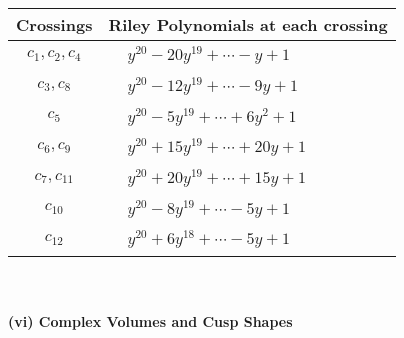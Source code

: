 \documentclass[1p]{elsarticle_modified}
\theoremstyle{definition}
\begin{document}
\begin{tabular}{m{50pt}|m{274pt}}
Crossings & \hspace{64pt}Riley Polynomials at each crossing \\
\hline $$\begin{aligned}c_{1},c_{2},c_{4}\end{aligned}$$&$\begin{aligned}
&y^{20}-20 y^{19}+\cdots- y+1
\end{aligned}$\\
\hline $$\begin{aligned}c_{3},c_{8}\end{aligned}$$&$\begin{aligned}
&y^{20}-12 y^{19}+\cdots-9 y+1
\end{aligned}$\\
\hline $$\begin{aligned}c_{5}\end{aligned}$$&$\begin{aligned}
&y^{20}-5 y^{19}+\cdots+6 y^2+1
\end{aligned}$\\
\hline $$\begin{aligned}c_{6},c_{9}\end{aligned}$$&$\begin{aligned}
&y^{20}+15 y^{19}+\cdots+20 y+1
\end{aligned}$\\
\hline $$\begin{aligned}c_{7},c_{11}\end{aligned}$$&$\begin{aligned}
&y^{20}+20 y^{19}+\cdots+15 y+1
\end{aligned}$\\
\hline $$\begin{aligned}c_{10}\end{aligned}$$&$\begin{aligned}
&y^{20}-8 y^{19}+\cdots-5 y+1
\end{aligned}$\\
\hline $$\begin{aligned}c_{12}\end{aligned}$$&$\begin{aligned}
&y^{20}+6 y^{18}+\cdots-5 y+1
\end{aligned}$\\
\hline
\end{tabular}\\~\\
\newpage\flushleft \textbf{(vi) Complex Volumes and Cusp Shapes}
\end{document}
